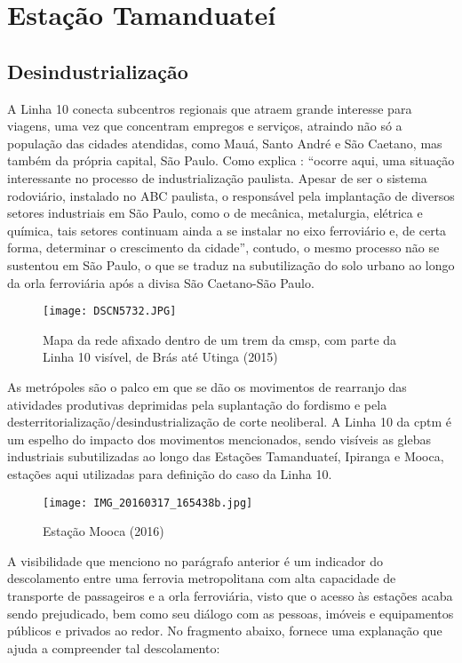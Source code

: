 \documentclass[11pt,fleqn]{book} %
\begin{document}
\section{Estação Tamanduateí}

\subsection{Desindustrialização}

A Linha 10 conecta subcentros regionais que atraem grande interesse para viagens, uma vez que concentram empregos e serviços, atraindo não só a população das cidades atendidas, como Mauá, Santo André e São Caetano, mas também da própria capital, São Paulo\cite[pág. 66]{Ferreira}. Como explica \cite[pág. 115]{Stefani}: ``ocorre aqui, uma situação interessante no processo de industrialização paulista. Apesar de ser o sistema rodoviário, instalado no ABC paulista, o responsável pela implantação de diversos setores industriais em São Paulo, como o de mecânica, metalurgia, elétrica e química, tais setores continuam ainda a se instalar no eixo ferroviário e, de certa forma, determinar o crescimento da cidade'', contudo, o mesmo processo não se sustentou em São Paulo, o que se traduz na subutilização do solo urbano ao longo da orla ferroviária após a divisa São Caetano-São Paulo.

\begin{figure}[h]
	\caption{Mapa da rede afixado dentro de um trem da \gls{cmsp}, com parte da Linha 10 visível, de Brás até Utinga (2015)}
	\texttt{[image: DSCN5732.JPG]}
\end{figure}

As metrópoles são o palco em que se dão os movimentos de rearranjo das atividades produtivas deprimidas pela suplantação do fordismo e pela desterritorialização/desindustrialização de corte neoliberal\cite{Acselrad}. A Linha 10 da \gls{cptm} é um espelho do impacto dos movimentos mencionados, sendo visíveis as glebas industriais subutilizadas ao longo das Estações Tamanduateí, Ipiranga e Mooca, estações aqui utilizadas para definição do caso da Linha 10.

\begin{figure}[h]
	\caption{Estação Mooca (2016)}
	\texttt{[image: IMG\_20160317\_165438b.jpg]}
\end{figure}

A visibilidade que menciono no parágrafo anterior é um indicador do descolamento entre uma ferrovia metropolitana com alta capacidade de transporte de passageiros e a orla ferroviária, visto que o acesso às estações acaba sendo prejudicado, bem como seu diálogo com as pessoas, imóveis e equipamentos públicos e privados ao redor. No fragmento abaixo, \cite{Acselrad} fornece uma explanação que ajuda a compreender tal descolamento:
\end{document}
